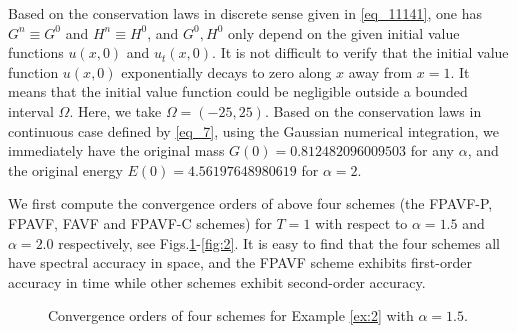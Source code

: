 \documentclass[preprint,compress,3p,10pt,fleqn]{elsarticle}
\numberwithin{equation}{section}
\begin{document}
Based on the conservation laws in discrete sense given in \eqref{eq_11141}, one has $G^n\equiv G^0$ and $H^n\equiv H^0$, and $G^0, H^0$ only depend on the given initial value functions $u(x,0)$ and $u_t(x, 0)$.
It is not difficult to verify that the initial value function $u(x, 0)$ exponentially decays to zero along $x$ away from $x=1$. It means that
the initial value function could be negligible outside a bounded interval $\Omega$. %
Here, we take $\Omega=(-25,25)$.
Based on the conservation laws in continuous case defined by \eqref{eq_7}, using the Gaussian numerical integration, we immediately have the original mass $G(0)=0.812482096009503$ for any $\alpha$, and the original energy $E(0)=4.56197648980619$ for $\alpha=2$.

We first compute the convergence orders of above four schemes (the FPAVF-P, FPAVF, FAVF and FPAVF-C schemes) for $T=1$ with respect to $\alpha=1.5$ and $\alpha=2.0$ respectively, see Figs.\ref{fig:1}-\ref{fig:2}.
It is easy to find that the four schemes all have spectral accuracy in space, and the FPAVF scheme exhibits first-order accuracy in time while other schemes exhibit second-order accuracy.

\begin{figure}[H]
\begin{center}
\caption{Convergence orders of four schemes for Example \ref{ex:2} with $\alpha=1.5$.} \label{fig:1}
\end{center}
\end{figure}
\end{document}
